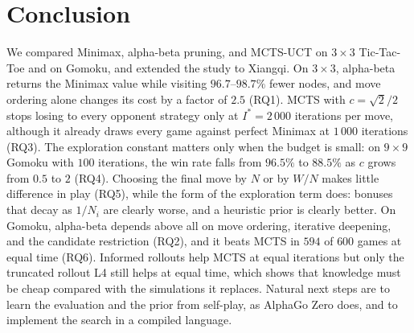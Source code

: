 \section{Conclusion}
\label{sec:conclusion}

We compared Minimax, alpha-beta pruning, and MCTS-UCT on $3\times 3$ Tic-Tac-Toe and on Gomoku, and extended the study to Xiangqi. On $3\times 3$, alpha-beta returns the Minimax value while visiting $96.7$--$98.7\%$ fewer nodes, and move ordering alone changes its cost by a factor of $2.5$ (RQ1). MCTS with $c = \sqrt{2}/2$ stops losing to every opponent strategy only at $I^{*} = 2\,000$ iterations per move, although it already draws every game against perfect Minimax at $1\,000$ iterations (RQ3). The exploration constant matters only when the budget is small: on $9\times 9$ Gomoku with $100$ iterations, the win rate falls from $96.5\%$ to $88.5\%$ as $c$ grows from $0.5$ to $2$ (RQ4). Choosing the final move by $N$ or by $W/N$ makes little difference in play (RQ5), while the form of the exploration term does: bonuses that decay as $1/N_i$ are clearly worse, and a heuristic prior is clearly better. On Gomoku, alpha-beta depends above all on move ordering, iterative deepening, and the candidate restriction (RQ2), and it beats MCTS in $594$ of $600$ games at equal time (RQ6). Informed rollouts help MCTS at equal iterations but only the truncated rollout L4 still helps at equal time, which shows that knowledge must be cheap compared with the simulations it replaces. Natural next steps are to learn the evaluation and the prior from self-play, as AlphaGo Zero does, and to implement the search in a compiled language.
